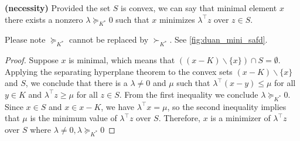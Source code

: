 \documentclass{article}
\newcommand{\bfs}[1]{\textbf{({#1}) }}
\begin{document}
\begin{lema}{\bfs{necessity}}\label{lem:ghfito}
  Provided the set $S$ is convex, we can say that  minimal element $x$ there exists a nonzero $\lambda \succeq_{K^{*}} 0$ such that $x$ minimizes $\lambda^{\top} z$ over $z \in S$.
\end{lema}
\begin{rema}
Please note $\succeq_{K^{*}}$ cannot be replaced by $\succ_{K^{*}}$. See \cref{fig:duan_mini_safd}.
\end{rema}
\begin{proof}\color{ForestGreen}
Suppose $x$ is minimal, which means that $((x-K) \backslash\{x\}) \cap S=\emptyset$. Applying the separating hyperplane theorem to the convex sets $(x-K) \backslash\{x\}$ and $S$, we conclude that there is a $\lambda \neq 0$ and $\mu$ such that $\lambda^{\top}(x-y) \leq \mu$ for all $y \in K$ and $\lambda^{\top} z \geq \mu$ for all $z \in S$. From the first inequality we conclude $\lambda \succeq_{K^{*}} 0$. Since $x \in S$ and $x \in x-K$, we have $\lambda^{\top} x=\mu$, so the second inequality implies that $\mu$ is the minimum value of $\lambda^{\top} z$ over $S .$ Therefore, $x$ is a minimizer of $\lambda^{\top} z$ over $S$ where $\lambda \neq 0, \lambda \succeq_{K^{*}} 0$
\end{proof} 
\end{document}
